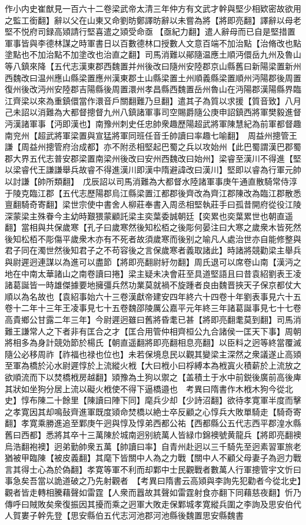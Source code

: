 作小内史崔猷見一百六十二卷梁武帝太清三年仲方有文武才幹與堅少相欵密故欲用之監工銜翻】辭以父在山東又命劉昉鄭譯昉辭以未嘗為將【將即亮翻】譯辭以母老堅不悦府司録高熲請行堅喜遣之熲受命亟【亟紀力翻】遣人辭母而已自是堅措置軍事皆與李德林謀之時軍書日以百數德林口授數人文意百端不加治點【治脩改也點塗點也不加治點不加塗改也治直之翻】司馬消難以鄖隨温應土順沔儇岳九州及魯山等八鎮來降【五代志漢東郡西魏置并州後改曰隨州安陸郡京山縣舊曰新陽梁置新州西魏改曰温州應山縣梁置應州漢東郡土山縣梁置土州順義縣梁置順州沔陽郡後周置復州後改沔州安陸郡吉陽縣後周置澴州孝昌縣西魏置岳州魯山在沔陽郡漢陽縣界臨江齊梁以來為重鎮儇當作澴音戶關翻難乃旦翻】遣其子為質以求援【質音致】八月己未詔以消難為大都督摠督九州八鎮諸軍事司空賜爵隨公庚申詔鎮西將軍樊毅進督沔漢諸軍事【沔即漢也】南豫州刺史任忠帥衆趣歷陽超武將軍陳慧紀為前軍都督趣南兖州【超武將軍梁置與宣猛將軍同班任音壬帥讀曰率趣七喻翻】　周益州摠管王謙【周益州摠管府治成都】亦不附丞相堅起巴蜀之兵以攻始州【此巴蜀謂漢巴郡蜀郡大界五代志普安郡梁置南梁州後改曰安州西魏改曰始州】梁睿至漢川不得進【堅以梁睿代王謙謙舉兵故睿不得進漢川即漢中隋避諱改曰漢川】堅即以睿為行軍元帥以討謙【帥所類翻】　戊辰詔以司馬消難為大都督水陸諸軍事庚午通直散騎常侍淳于陵克臨江郡【五代志歷陽郡烏江縣梁置江都郡後齊改為齊江郡陳改為臨江郡散悉亶翻騎奇寄翻】梁世宗使中書舍人柳莊奉書入周丞相堅執莊手曰孤昔開府從役江陵深蒙梁主殊眷今主幼時艱猥蒙顧託梁主奕葉委誠朝廷【奕累也奕葉累世也朝直遥翻】當相與共保歲寒【孔子曰歲寒然後知松栢之後彫何晏注曰大寒之歲衆木皆死然後知松栢不彫傷平歲衆木亦有不死者故須歲寒而後别之喻凡人處治世亦自能修整與君子同在濁世然後知君子之不苟容後之言保歲寒者義取諸此】時諸將競勸梁主舉兵與尉遲迥連謀以為進可以盡節【將即亮翻尉紆勿翻】周氏退可以席卷山南【漢沔之地在中南太華諸山之南卷讀曰捲】梁主疑未决會莊至具道堅語且曰昔袁紹劉表王凌諸葛誕皆一時雄傑據要地擁彊兵然功業莫就禍不旋踵者良由魏晋挾天子保京都仗大順以為名故也【袁紹事始六十三卷漢獻帝建安四年終六十四卷十年劉表事見六十五卷十二年十三年王凌事見七十五卷魏邵陵厲公嘉平元年終三年諸葛誕事見七十七卷高貴鄉公甘露二年三年】今尉遲迥雖曰舊將昏耄已甚【將即亮翻耄莫到翻】司馬消難王謙常人之下者非有匡合之才【匡合用管仲相齊桓公九合諸侯一匡天下事】周朝將相多為身計競効節於楊氏【朝直遥翻將即亮翻相息亮翻】以臣料之迥等終當覆滅隨公必移周祚【祚福也禄也位也】未若保境息民以觀其變梁主深然之衆議遂止高熲至軍為橋於沁水尉遲惇於上流縱火栰【大曰栰小曰桴縛本為栰寘火積薪於上流放之欲順流而下以焚橋栰房越翻】熲豫為土狗以禦之【盖積土于水中前鋭後廣前高後庳其狀如坐狗分居上流以礙火栰使不得下逼橋邉也　考異曰隋書作木栰木狗今從北史】惇布陳二十餘里【陳讀曰陣下同】麾兵少却【少詩沼翻】欲待孝寛軍半度而擊之孝寛因其却鳴鼔齊進軍既度熲命焚橋以絶士卒反顧之心惇兵大敗單騎走【騎奇寄翻】孝寛乘勝進追至鄴庚午迥與惇及惇弟西都公祐【西都縣公五代志西平郡湟水縣舊曰西都】悉將其卒十三萬陳於城南迥别統萬人皆緑巾錦襖號黄龍兵【將即亮翻襖烏浩翻袍襖】迥弟勤帥衆五萬【帥讀曰率】自青州赴迥以三千騎先至迥素習軍旅老猶被甲臨陳【被皮義翻】其麾下皆關中人為之力戰【關中人不顧父母妻子為迥力戰言其得士心為於偽翻】孝寛等軍不利而却鄴中士民觀戰者數萬人行軍摠管宇文忻曰事急矣吾當以詭道破之乃先射觀者　【考異曰隋書云高熲與李詢先犯勸者今從北史】觀者皆走轉相騰藉聲如雷霆【人衆而囂故其聲如雷霆射食亦翻下同藉慈夜翻】忻乃傳呼曰賊敗矣衆復振因其擾而乘之迥軍大敗走保鄴城孝寛縱兵圍之李詢及思安伯代人賀婁子幹先登【思安縣伯五代志河池郡河池縣後魏置思安縣魏書